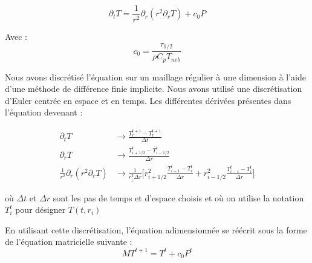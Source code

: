 \documentclass[10pt,a4paper]{article}
\numberwithin{equation}{section}
\begin{document}
\begin{equation}
 \partial_{t} T =  \frac{1}{r^2} \partial_{r} ( {r}^2 \partial_{r} T)  + c_0 P 
\end{equation}

Avec :
\begin{equation}
 c_0 = \frac{\tau_{1/2}}{\rho C_p T_{neb}}
\end{equation}


Nous avons discrétisé l'équation sur un maillage régulier à une dimension à l'aide d'une méthode de différence finie implicite. Nous avons utilisé une discrétisation d'Euler centrée en espace et en temps. Les différentes dérivées présentes dans l'équation devenant :

\begin{align}
\partial_t T &\rightarrow  \frac{T^{t+1}_r - T^{t+1}_r}{\Delta t}\\
\partial_r T &\rightarrow  \frac{T^t_{i+1/2} - T^{t}_{i-1/2}}{\Delta r} \\
\frac{1}{r^2}\partial_r (r^2 \partial_r T ) &\rightarrow \frac{1}{r^2_i \Delta r}\Big [ r^2_{i+1/2}\frac{T^t_{i+1} - T^{t}_{i}}{\Delta r} + r^2_{i-1/2}\frac{T^t_{i-1} - T^{t}_{i}}{\Delta r} \Big]
\end{align}

où $\Delta t$ et $\Delta r$ sont les pas de temps et d'espace choisis et où on utilise la notation $T^{t}_i$ pour désigner $T(t,r_i)$ 

En utilisant cette discrétisation, l'équation adimensionnée se réécrit sous la forme de l'équation matricielle suivante :
\begin{equation}
MT^{t+1} = T^t + c_0 P^{t}
\end{equation}
\end{document}
